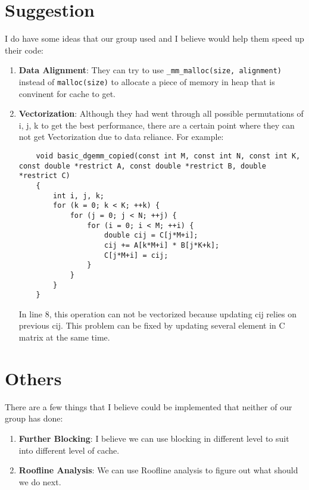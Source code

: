 \documentclass[11pt]{article}
\begin{document}
    \section*{Suggestion}
	    I do have some ideas that our group used and I believe would help them speed up their code:
	    \begin{enumerate}
			\item \textbf{Data Alignment}: They can try to use \texttt{\_mm\_malloc(size, alignment)} instead of \texttt{malloc(size)} to allocate a piece of memory in heap that is convinent for cache to get.
			\item \textbf{Vectorization}: Although they had went through all possible permutations of i, j, k to get the best performance, there are a certain point where they can not get Vectorization due to data reliance. For example:
			
			\begin{lstlisting}
	void basic_dgemm_copied(const int M, const int N, const int K, const double *restrict A, const double *restrict B, double *restrict C)
	{
		int i, j, k;
		for (k = 0; k < K; ++k) {
			for (j = 0; j < N; ++j) {
				for (i = 0; i < M; ++i) {
					double cij = C[j*M+i];
					cij += A[k*M+i] * B[j*K+k];
					C[j*M+i] = cij;
				}
			}
		}
	}
			\end{lstlisting}
			
			In line 8, this operation can not be vectorized because updating cij relies on previous cij. This problem can be fixed by updating several element in C matrix at the same time.
			
	    \end{enumerate}
    
    \section*{Others}
    
    There are a few things that I believe could be implemented that neither of our group has done:
	    \begin{enumerate}
	    	\item \textbf{Further Blocking}: I believe we can use blocking in different level to suit into different level of cache.
	    	\item \textbf{Roofline Analysis}: We can use Roofline analysis to figure out what should we do next.
	    \end{enumerate}
\end{document}
